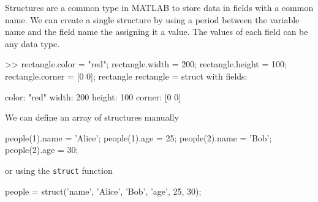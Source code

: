 Structures are a common type in MATLAB to store data in fields with a common name. We can create a single structure by using a period between the variable name and the field name the assigning it a value.  The values of each field can be any data type.
\begin{code}
>> rectangle.color = "red";
rectangle.width = 200;
rectangle.height = 100;
rectangle.corner = [0 0];
rectangle
rectangle = 
  struct with fields:

     color: "red"
     width: 200
    height: 100
    corner: [0 0]
\end{code}

We can define an array of structures manually
\begin{code}
    people(1).name = 'Alice';
    people(1).age = 25;
    people(2).name = 'Bob';
    people(2).age = 30;
\end{code}

or using the \lstinline{struct} function
\begin{code}
people = struct('name', {'Alice', 'Bob'}, 'age', {25, 30});
\end{code}






